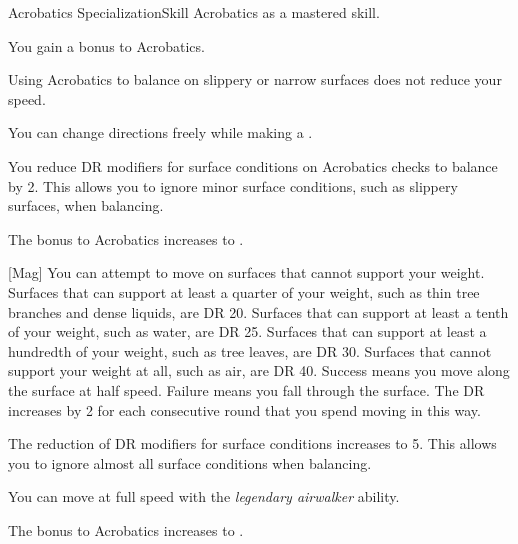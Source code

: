     \begin{feat}{Acrobatics Specialization}{Skill}
        \featpre Acrobatics as a mastered skill.

         You gain a  bonus to Acrobatics.

         Using Acrobatics to balance on slippery or narrow surfaces does not reduce your speed.

         You can change directions freely while making a .

         You reduce DR modifiers for surface conditions on Acrobatics checks to balance by 2.
        This allows you to ignore minor surface conditions, such as slippery surfaces, when balancing.

         The bonus to Acrobatics increases to .

        [Mag] You can attempt to move on surfaces that cannot support your weight.
        Surfaces that can support at least a quarter of your weight, such as thin tree branches and dense liquids, are DR 20.
        Surfaces that can support at least a tenth of your weight, such as water, are DR 25.
        Surfaces that can support at least a hundredth of your weight, such as tree leaves, are DR 30.
        Surfaces that cannot support your weight at all, such as air, are DR 40.
        Success means you move along the surface at half speed.
        Failure means you fall through the surface.
        The DR increases by 2 for each consecutive round that you spend moving in this way.

         The reduction of DR modifiers for surface conditions increases to 5.
        This allows you to ignore almost all surface conditions when balancing.

         You can move at full speed with the \textit{legendary airwalker} ability.

         The bonus to Acrobatics increases to .

        \ff[18]{} 
    \end{feat}

